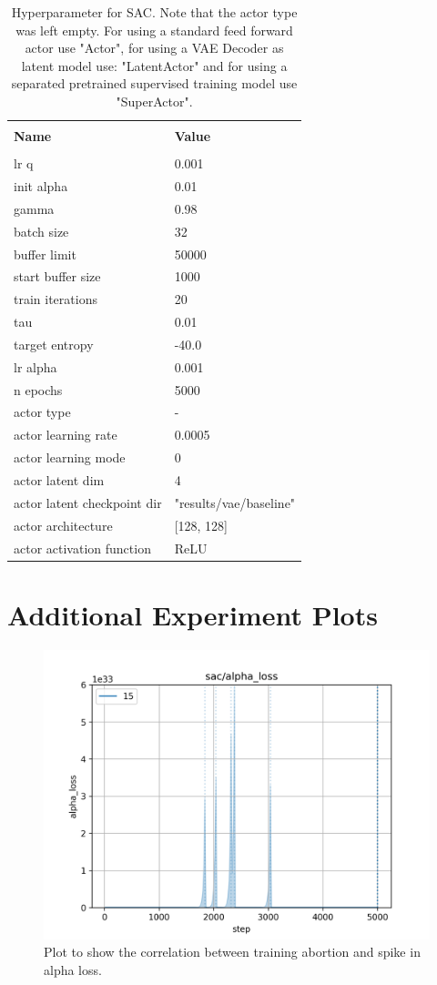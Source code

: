 \begin{table}
    \label{tab:SAC_Baseline_Hyperparameters}
    \begin{center}
        \begin{tabular}{ l | l }
        \hline \\
        \textbf{Name} & \textbf{Value} \\
        \hline \\
        lr q & 0.001 \\
        init alpha & 0.01 \\
        gamma & 0.98\\
        batch size & 32 \\
        buffer limit & 50000 \\
        start buffer size & 1000 \\
        train iterations & 20 \\
        tau & 0.01 \\
        target entropy & -40.0 \\
        lr alpha & 0.001 \\
        n epochs & 5000 \\
        actor type & - \\
        actor learning rate & 0.0005 \\
        actor learning mode & 0 \\
        actor latent dim & 4 \\
        actor latent checkpoint dir & "results/vae/baseline" \\
        actor architecture & [128, 128] \\
        actor activation function & ReLU \\
        \end{tabular}
    \end{center}
    \caption[SAC Hyperparameter]{Hyperparameter for SAC. Note that the actor type was left empty. For using a standard feed forward actor use "Actor", for using a VAE Decoder as  latent model use: "LatentActor" and for using a separated pretrained supervised training model use "SuperActor".}
\end{table}

\section{Additional Experiment Plots}

\begin{figure}
    \begin{center}
        \includegraphics[width=0.23 \linewidth]{figures/appendix/alpha_loss_15.png}
    \end{center}
    \caption[alpha loss with $N = 15$]{Plot to show the correlation between training abortion and spike in alpha loss.}
    \label{fig:alpha_loss_15}
\end{figure}